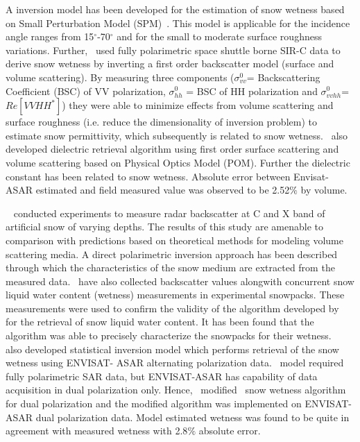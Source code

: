 \begin{description}
	A inversion model has been developed for the estimation of snow wetness based on Small Perturbation Model (SPM)~\citep{Shi93}. This model is applicable for the incidence angle ranges from 15$^\circ$-70$^\circ$ and for the small to moderate surface roughness variations. Further,~\citep{Shi95wetness} used fully polarimetric space shuttle borne SIR-C data to derive snow wetness by inverting a first order backscatter model (surface and volume scattering). By measuring three components ($\sigma_{vv}^0$= Backscattering Coefficient (BSC) of VV polarization, $\sigma_{hh}^0$ = BSC of HH polarization and $\sigma_{vvhh}^0$=$Re[VVHH^*]$) they were able to minimize effects from volume scattering and surface roughness (i.e. reduce the dimensionality of inversion problem) to estimate snow permittivity, which subsequently is related to snow wetness.~\citep{singh2006snow} also developed dielectric retrieval algorithm using first order surface scattering and volume scattering based on Physical Optics Model (POM). Further the dielectric constant has been related to snow wetness. Absolute error between Envisat-ASAR estimated and field measured value was observed to be 2.52$\%$ by volume.
	
	~\citep{Kendra98} conducted experiments to measure radar backscatter at C and X band of artificial snow of varying depths. The results of this study are amenable to comparison with predictions based on theoretical methods for modeling volume scattering media.  A direct polarimetric inversion approach has been described through which the characteristics of the snow medium are extracted from the measured data.~\citep{Kendra98} have also collected backscatter values alongwith concurrent snow liquid water content (wetness) measurements in experimental snowpacks. These measurements were used to confirm the validity of the algorithm developed by~\citep{Shi95wetness} for the retrieval of snow liquid water content. It has been found that the algorithm was able to precisely characterize the snowpacks for their wetness.~\citep{niang2007new} also developed statistical inversion model which performs retrieval of the snow wetness using ENVISAT- ASAR alternating polarization data.~\citep{Shi95wetness} model required fully polarimetric SAR data, but ENVISAT-ASAR has capability of data acquisition in dual polarization only. Hence,~\citep{singh2010snow} modified~\citep{Shi95wetness} snow wetness algorithm for dual polarization and the modified algorithm was implemented on ENVISAT-ASAR dual polarization data.  Model estimated wetness was found to be quite in agreement with measured wetness with 2.8$\%$ absolute error.	
\end{description}

